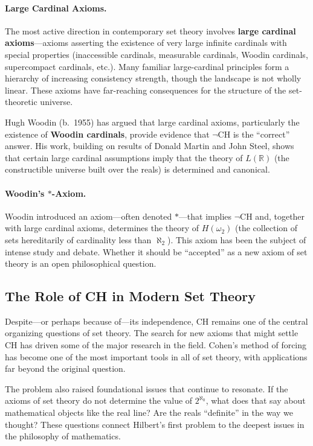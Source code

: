 \paragraph{Large Cardinal Axioms.}
The most active direction in contemporary set theory involves \textbf{large cardinal axioms}---axioms asserting the existence of very large infinite cardinals with special properties (inaccessible cardinals, measurable cardinals, Woodin cardinals, supercompact cardinals, etc.). Many familiar large-cardinal principles form a hierarchy of increasing consistency strength, though the landscape is not wholly linear. These axioms have far-reaching consequences for the structure of the set-theoretic universe.

Hugh Woodin (b.\ 1955) has argued that large cardinal axioms, particularly the existence of \textbf{Woodin cardinals}, provide evidence that $\neg$CH is the ``correct'' answer. His work, building on results of Donald Martin and John Steel, shows that certain large cardinal assumptions imply that the theory of $L(\mathbb{R})$ (the constructible universe built over the reals) is determined and canonical.

\paragraph{Woodin's $\ast$-Axiom.}
Woodin introduced an axiom---often denoted $\ast$---that implies $\neg$CH and, together with large cardinal axioms, determines the theory of $H(\omega_2)$ (the collection of sets hereditarily of cardinality less than $\aleph_2$). This axiom has been the subject of intense study and debate. Whether it should be ``accepted'' as a new axiom of set theory is an open philosophical question.

\subsection{The Role of CH in Modern Set Theory}

Despite---or perhaps because of---its independence, CH remains one of the central organizing questions of set theory. The search for new axioms that might settle CH has driven some of the major research in the field. Cohen's method of forcing has become one of the most important tools in all of set theory, with applications far beyond the original question.

The problem also raised foundational issues that continue to resonate. If the axioms of set theory do not determine the value of $2^{\aleph_0}$, what does that say about mathematical objects like the real line? Are the reals ``definite'' in the way we thought? These questions connect Hilbert's first problem to the deepest issues in the philosophy of mathematics.

